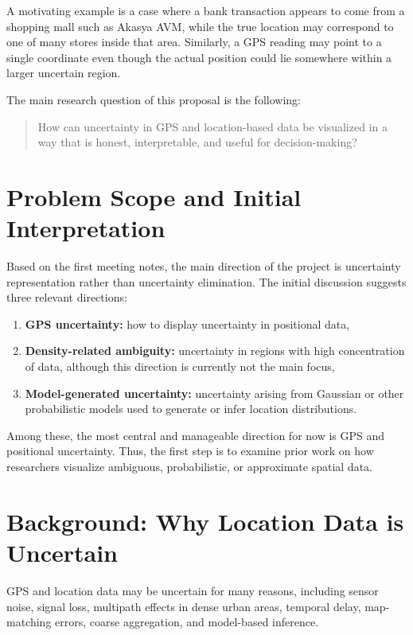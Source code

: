 \documentclass[conference]{IEEEtran}
\begin{document}
A motivating example is a case where a bank transaction appears to come from a shopping mall such as Akasya AVM, while the true location may correspond to one of many stores inside that area. Similarly, a GPS reading may point to a single coordinate even though the actual position could lie somewhere within a larger uncertain region.

The main research question of this proposal is the following:

\begin{quote}
How can uncertainty in GPS and location-based data be visualized in a way that is honest, interpretable, and useful for decision-making?
\end{quote}

\section{Problem Scope and Initial Interpretation}

Based on the first meeting notes, the main direction of the project is uncertainty representation rather than uncertainty elimination. The initial discussion suggests three relevant directions:

\begin{enumerate}[leftmargin=1.5em]
    \item \textbf{GPS uncertainty:} how to display uncertainty in positional data,
    \item \textbf{Density-related ambiguity:} uncertainty in regions with high concentration of data, although this direction is currently not the main focus,
    \item \textbf{Model-generated uncertainty:} uncertainty arising from Gaussian or other probabilistic models used to generate or infer location distributions.
\end{enumerate}

Among these, the most central and manageable direction for now is GPS and positional uncertainty. Thus, the first step is to examine prior work on how researchers visualize ambiguous, probabilistic, or approximate spatial data.

\section{Background: Why Location Data is Uncertain}

GPS and location data may be uncertain for many reasons, including sensor noise, signal loss, multipath effects in dense urban areas, temporal delay, map-matching errors, coarse aggregation, and model-based inference.
\end{document}
